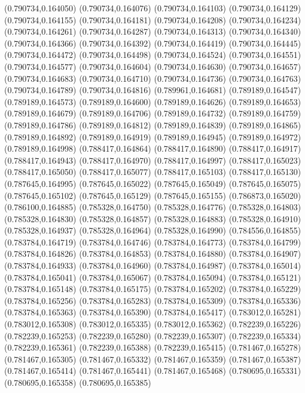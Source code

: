 (0.790734,0.164050)
(0.790734,0.164076)
(0.790734,0.164103)
(0.790734,0.164129)
(0.790734,0.164155)
(0.790734,0.164181)
(0.790734,0.164208)
(0.790734,0.164234)
(0.790734,0.164261)
(0.790734,0.164287)
(0.790734,0.164313)
(0.790734,0.164340)
(0.790734,0.164366)
(0.790734,0.164392)
(0.790734,0.164419)
(0.790734,0.164445)
(0.790734,0.164472)
(0.790734,0.164498)
(0.790734,0.164524)
(0.790734,0.164551)
(0.790734,0.164577)
(0.790734,0.164604)
(0.790734,0.164630)
(0.790734,0.164657)
(0.790734,0.164683)
(0.790734,0.164710)
(0.790734,0.164736)
(0.790734,0.164763)
(0.790734,0.164789)
(0.790734,0.164816)
(0.789961,0.164681)
(0.789189,0.164547)
(0.789189,0.164573)
(0.789189,0.164600)
(0.789189,0.164626)
(0.789189,0.164653)
(0.789189,0.164679)
(0.789189,0.164706)
(0.789189,0.164732)
(0.789189,0.164759)
(0.789189,0.164786)
(0.789189,0.164812)
(0.789189,0.164839)
(0.789189,0.164865)
(0.789189,0.164892)
(0.789189,0.164919)
(0.789189,0.164945)
(0.789189,0.164972)
(0.789189,0.164998)
(0.788417,0.164864)
(0.788417,0.164890)
(0.788417,0.164917)
(0.788417,0.164943)
(0.788417,0.164970)
(0.788417,0.164997)
(0.788417,0.165023)
(0.788417,0.165050)
(0.788417,0.165077)
(0.788417,0.165103)
(0.788417,0.165130)
(0.787645,0.164995)
(0.787645,0.165022)
(0.787645,0.165049)
(0.787645,0.165075)
(0.787645,0.165102)
(0.787645,0.165129)
(0.787645,0.165155)
(0.786873,0.165020)
(0.786100,0.164885)
(0.785328,0.164750)
(0.785328,0.164776)
(0.785328,0.164803)
(0.785328,0.164830)
(0.785328,0.164857)
(0.785328,0.164883)
(0.785328,0.164910)
(0.785328,0.164937)
(0.785328,0.164964)
(0.785328,0.164990)
(0.784556,0.164855)
(0.783784,0.164719)
(0.783784,0.164746)
(0.783784,0.164773)
(0.783784,0.164799)
(0.783784,0.164826)
(0.783784,0.164853)
(0.783784,0.164880)
(0.783784,0.164907)
(0.783784,0.164933)
(0.783784,0.164960)
(0.783784,0.164987)
(0.783784,0.165014)
(0.783784,0.165041)
(0.783784,0.165067)
(0.783784,0.165094)
(0.783784,0.165121)
(0.783784,0.165148)
(0.783784,0.165175)
(0.783784,0.165202)
(0.783784,0.165229)
(0.783784,0.165256)
(0.783784,0.165283)
(0.783784,0.165309)
(0.783784,0.165336)
(0.783784,0.165363)
(0.783784,0.165390)
(0.783784,0.165417)
(0.783012,0.165281)
(0.783012,0.165308)
(0.783012,0.165335)
(0.783012,0.165362)
(0.782239,0.165226)
(0.782239,0.165253)
(0.782239,0.165280)
(0.782239,0.165307)
(0.782239,0.165334)
(0.782239,0.165361)
(0.782239,0.165388)
(0.782239,0.165415)
(0.781467,0.165278)
(0.781467,0.165305)
(0.781467,0.165332)
(0.781467,0.165359)
(0.781467,0.165387)
(0.781467,0.165414)
(0.781467,0.165441)
(0.781467,0.165468)
(0.780695,0.165331)
(0.780695,0.165358)
(0.780695,0.165385)
